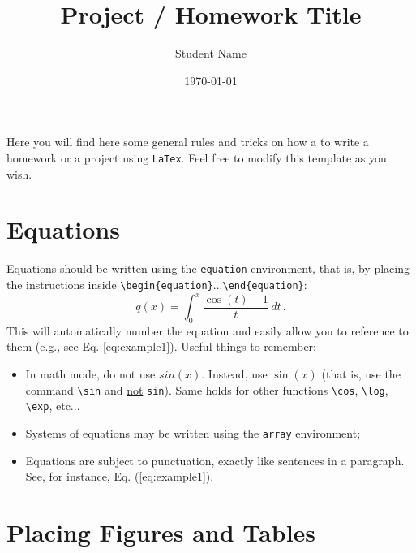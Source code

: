 \documentclass[10pt]{article}
\title{Project / Homework Title}
\author{Student Name}
\date{\today}
\begin{document}
\maketitle

\renewcommand{\vec}[1]{\boldsymbol{#1}}
\newcommand{\tens}[1]{\mathsf{#1}}
\newcommand{\pd}[2]{\frac{\partial #1}{\partial #2} }
\newcommand{\HALF}{\frac{1}{2}}
\newcommand{\DS}{\displaystyle}


Here you will find here some general rules and tricks on how a to write a homework or a project using \texttt{LaTex}.
Feel free to modify this template as you wish.

\section{Equations}
%
%
Equations should be written using the \texttt{equation} environment, that is, by placing the instructions inside \texttt{\textbackslash begin\{equation\}}...\texttt{\textbackslash end\{equation\}}:
%
\begin{equation}\label{eq:example1}
  q(x) = \int_0^x \frac{\cos(t)-1}{t} \, dt  \,.
\end{equation}
%
This will automatically number the equation and easily allow you to reference to them (e.g., see Eq. \ref{eq:example1}).
Useful things to remember:
\begin{itemize}
    \item In math mode, do not use $sin(x)$. Instead, use $\sin(x)$ (that is, use the command \texttt{\textbackslash sin} and \underline{not} \texttt{sin}).
    Same holds for other functions \texttt{\textbackslash cos}, \texttt{\textbackslash log}, \texttt{\textbackslash exp}, etc...
    \item Systems of equations may be written using the \texttt{array} environment;
    \item Equations are subject to punctuation, exactly like sentences in a paragraph. See, for instance, Eq. (\ref{eq:example1}).
\end{itemize}
\section{Placing Figures and Tables}
%
%
\end{document}
